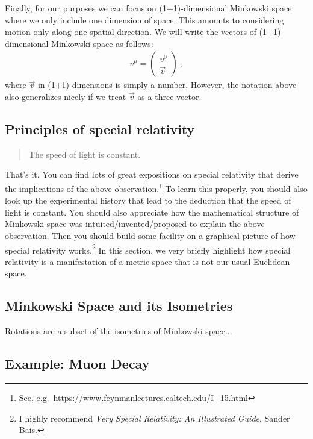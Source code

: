\documentclass[12pt]{article}
\begin{document}
Finally, for our purposes we can focus on (1+1)-dimensional Minkowski space where we only include one dimension of space. This amounts to considering motion only along one spatial direction. We will write the vectors of (1+1)-dimensional Minkowski space as follows:
\begin{align}
    v^\mu = 
    \begin{pmatrix}
    v^0\\
    \vec{v}    
    \end{pmatrix} \ ,
\end{align}
where $\vec{v}$ in (1+1)-dimensions is simply a number. However, the notation above also generalizes nicely if we treat $\vec{v}$ as a three-vector. 



\subsection{Principles of special relativity}

\begin{quote}
The speed of light is constant.
\end{quote}

That's it. You can find lots of great expositions on special relativity that derive the implications of the above observation.\footnote{See, e.g.~\url{https://www.feynmanlectures.caltech.edu/I_15.html}} To learn this properly, you should also look up the experimental history that lead to the deduction that the speed of light is constant. You should also appreciate how the mathematical structure of Minkowski space was intuited/invented/proposed to explain the above observation. Then you should build some facility on a graphical picture of how special relativity works.\footnote{I highly recommend \emph{Very Special Relativity: An Illustrated Guide}, Sander Bais.} In this section, we very briefly highlight how special relativity is a manifestation of a metric space that is not our usual Euclidean space. 

\subsection{Minkowski Space and its Isometries} 


\begin{example}
Rotations are a subset of the isometries of Minkowski space...
\end{example}

\subsection{Example: Muon Decay}
\end{document}
